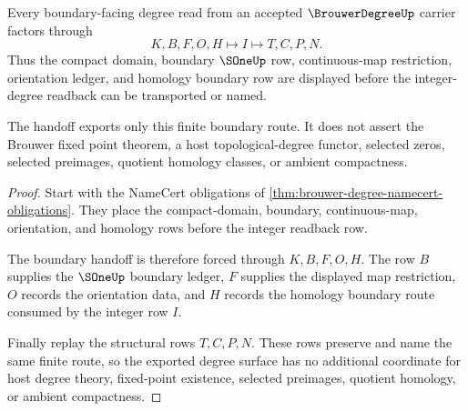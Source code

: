 \begin{theorem}
\label{thm:brouwer-degree-boundary-handoff}
Every boundary-facing degree read from an accepted $\BrouwerDegreeUp$ carrier factors through
$$
K,B,F,O,H\longmapsto I\longmapsto T,C,P,N .
$$
Thus the compact domain, boundary $\SOneUp$ row, continuous-map restriction, orientation ledger, and homology boundary row are displayed before the integer-degree readback can be transported or named.

The handoff exports only this finite boundary route. It does not assert the Brouwer fixed point theorem, a host topological-degree functor, selected zeros, selected preimages, quotient homology classes, or ambient compactness.
\end{theorem}
\begin{proof}
Start with the NameCert obligations of \autoref{thm:brouwer-degree-namecert-obligations}. They place the compact-domain, boundary, continuous-map, orientation, and homology rows before the integer readback row.

The boundary handoff is therefore forced through $K,B,F,O,H$. The row $B$ supplies the $\SOneUp$ boundary ledger, $F$ supplies the displayed map restriction, $O$ records the orientation data, and $H$ records the homology boundary route consumed by the integer row $I$.

Finally replay the structural rows $T,C,P,N$. These rows preserve and name the same finite route, so the exported degree surface has no additional coordinate for host degree theory, fixed-point existence, selected preimages, quotient homology, or ambient compactness.
\end{proof}





